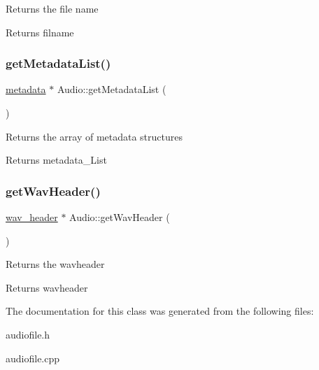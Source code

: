 Returns the file name \begin{DoxyReturn}{Returns}
filname 
\end{DoxyReturn}
\mbox{\label{classAudio_a6da23521eb58061da65ac88823b875e6}} 
\subsubsection{\texorpdfstring{get\+Metadata\+List()}{getMetadataList()}}
{\footnotesize\ttfamily \hyperlink{structmetadata}{metadata} $\ast$ Audio\+::get\+Metadata\+List (\begin{DoxyParamCaption}{ }\end{DoxyParamCaption})}

Returns the array of metadata structures \begin{DoxyReturn}{Returns}
metadata\+\_\+\+List 
\end{DoxyReturn}
\mbox{\label{classAudio_ac0c6115c2102ec602cdc99dc9929fb86}} 
\subsubsection{\texorpdfstring{get\+Wav\+Header()}{getWavHeader()}}
{\footnotesize\ttfamily \hyperlink{structwav__header}{wav\+\_\+header} $\ast$ Audio\+::get\+Wav\+Header (\begin{DoxyParamCaption}{ }\end{DoxyParamCaption})}

Returns the wavheader \begin{DoxyReturn}{Returns}
wavheader 
\end{DoxyReturn}


The documentation for this class was generated from the following files\+:\begin{DoxyCompactItemize}
\item 
audiofile.\+h\item 
audiofile.\+cpp\end{DoxyCompactItemize}
